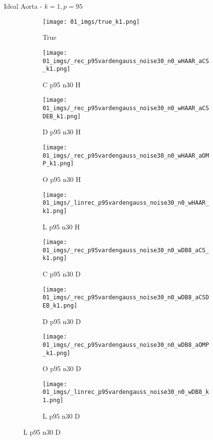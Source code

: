 \begin{frame}{Ideal Aorta - $k=1,p=95$}{}
\begin{figure}
\begin{subfigure}{0.1\textwidth}
\texttt{[image: 01\_imgs/true\_k1.png]}
\caption*{\Tiny True}
\end{subfigure}
\begin{subfigure}{0.1\textwidth}
\texttt{[image: 01\_imgs/\_rec\_p95vardengauss\_noise30\_n0\_wHAAR\_aCS\_k1.png]}
\caption*{\Tiny C p95 n30 H}
\end{subfigure}
\begin{subfigure}{0.1\textwidth}
\texttt{[image: 01\_imgs/\_rec\_p95vardengauss\_noise30\_n0\_wHAAR\_aCSDEB\_k1.png]}
\caption*{\Tiny D p95 n30 H}
\end{subfigure}
\begin{subfigure}{0.1\textwidth}
\texttt{[image: 01\_imgs/\_rec\_p95vardengauss\_noise30\_n0\_wHAAR\_aOMP\_k1.png]}
\caption*{\Tiny O p95 n30 H}
\end{subfigure}
\begin{subfigure}{0.1\textwidth}
\texttt{[image: 01\_imgs/\_linrec\_p95vardengauss\_noise30\_n0\_wHAAR\_k1.png]}
\caption*{\Tiny L p95 n30 H}
\end{subfigure}
\begin{subfigure}{0.1\textwidth}
\texttt{[image: 01\_imgs/\_rec\_p95vardengauss\_noise30\_n0\_wDB8\_aCS\_k1.png]}
\caption*{\Tiny C p95 n30 D}
\end{subfigure}
\begin{subfigure}{0.1\textwidth}
\texttt{[image: 01\_imgs/\_rec\_p95vardengauss\_noise30\_n0\_wDB8\_aCSDEB\_k1.png]}
\caption*{\Tiny D p95 n30 D}
\end{subfigure}
\begin{subfigure}{0.1\textwidth}
\texttt{[image: 01\_imgs/\_rec\_p95vardengauss\_noise30\_n0\_wDB8\_aOMP\_k1.png]}
\caption*{\Tiny O p95 n30 D}
\end{subfigure}
\begin{subfigure}{0.1\textwidth}
\texttt{[image: 01\_imgs/\_linrec\_p95vardengauss\_noise30\_n0\_wDB8\_k1.png]}
\caption*{\Tiny L p95 n30 D}
\end{subfigure}
\end{figure}
\end{frame}


